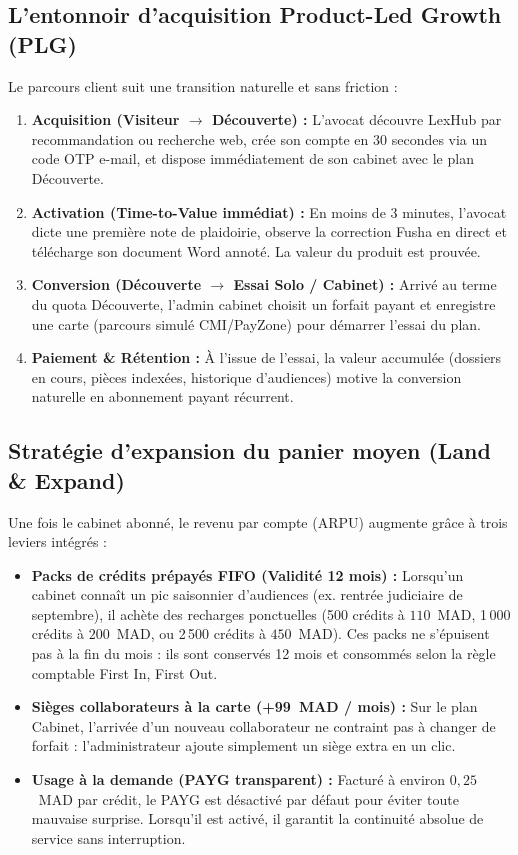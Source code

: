 \subsection{L'entonnoir d'acquisition Product-Led Growth (PLG)}
Le parcours client suit une transition naturelle et sans friction :
\begin{enumerate}[leftmargin=*]
  \item \textbf{Acquisition (Visiteur $\rightarrow$ Découverte) :} L'avocat découvre LexHub par recommandation ou recherche web, crée son compte en 30 secondes via un code OTP e-mail, et dispose immédiatement de son cabinet avec le plan Découverte.
  \item \textbf{Activation (Time-to-Value immédiat) :} En moins de 3 minutes, l'avocat dicte une première note de plaidoirie, observe la correction Fusha en direct et télécharge son document Word annoté. La valeur du produit est prouvée.
  \item \textbf{Conversion (Découverte $\rightarrow$ Essai Solo / Cabinet) :} Arrivé au terme du quota Découverte, l'admin cabinet choisit un forfait payant et enregistre une carte (parcours simulé CMI/PayZone) pour démarrer l'essai du plan.
  \item \textbf{Paiement & Rétention :} À l'issue de l'essai, la valeur accumulée (dossiers en cours, pièces indexées, historique d'audiences) motive la conversion naturelle en abonnement payant récurrent.
\end{enumerate}

\subsection{Stratégie d'expansion du panier moyen (Land \& Expand)}
Une fois le cabinet abonné, le revenu par compte (ARPU) augmente grâce à trois leviers intégrés :
\begin{itemize}[leftmargin=*]
  \item \textbf{Packs de crédits prépayés FIFO (Validité 12 mois) :} Lorsqu'un cabinet connaît un pic saisonnier d'audiences (ex. rentrée judiciaire de septembre), il achète des recharges ponctuelles (500 crédits à $110$~MAD, 1\,000 crédits à $200$~MAD, ou 2\,500 crédits à $450$~MAD). Ces packs ne s'épuisent pas à la fin du mois : ils sont conservés 12 mois et consommés selon la règle comptable First In, First Out.
  \item \textbf{Sièges collaborateurs à la carte (+99~MAD / mois) :} Sur le plan Cabinet, l'arrivée d'un nouveau collaborateur ne contraint pas à changer de forfait : l'administrateur ajoute simplement un siège extra en un clic.
  \item \textbf{Usage à la demande (PAYG transparent) :} Facturé à environ $0{,}25$~MAD par crédit, le PAYG est désactivé par défaut pour éviter toute mauvaise surprise. Lorsqu'il est activé, il garantit la continuité absolue de service sans interruption.
\end{itemize}

